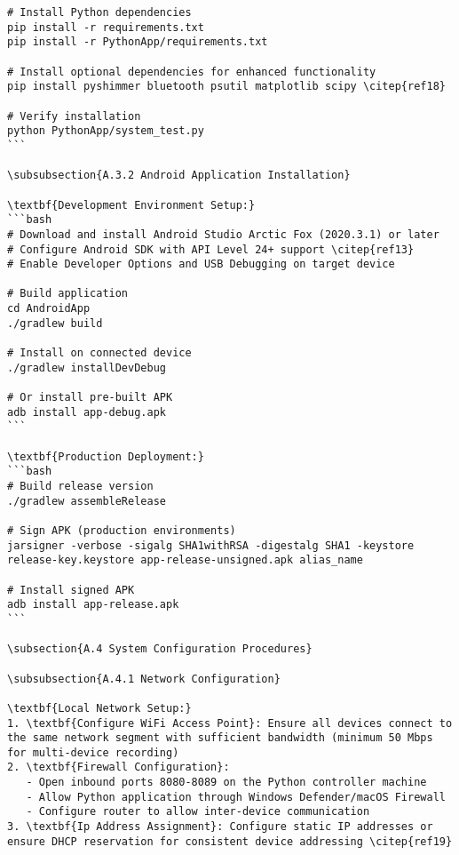 \begin{verbatim}
# Install Python dependencies
pip install -r requirements.txt
pip install -r PythonApp/requirements.txt

# Install optional dependencies for enhanced functionality
pip install pyshimmer bluetooth psutil matplotlib scipy \citep{ref18}

# Verify installation
python PythonApp/system_test.py
```

\subsubsection{A.3.2 Android Application Installation}

\textbf{Development Environment Setup:}
```bash
# Download and install Android Studio Arctic Fox (2020.3.1) or later
# Configure Android SDK with API Level 24+ support \citep{ref13}
# Enable Developer Options and USB Debugging on target device

# Build application
cd AndroidApp
./gradlew build

# Install on connected device
./gradlew installDevDebug

# Or install pre-built APK
adb install app-debug.apk
```

\textbf{Production Deployment:}
```bash
# Build release version
./gradlew assembleRelease

# Sign APK (production environments)
jarsigner -verbose -sigalg SHA1withRSA -digestalg SHA1 -keystore release-key.keystore app-release-unsigned.apk alias_name

# Install signed APK
adb install app-release.apk
```

\subsection{A.4 System Configuration Procedures}

\subsubsection{A.4.1 Network Configuration}

\textbf{Local Network Setup:}
1. \textbf{Configure WiFi Access Point}: Ensure all devices connect to the same network segment with sufficient bandwidth (minimum 50 Mbps for multi-device recording)
2. \textbf{Firewall Configuration}:
   - Open inbound ports 8080-8089 on the Python controller machine
   - Allow Python application through Windows Defender/macOS Firewall
   - Configure router to allow inter-device communication
3. \textbf{Ip Address Assignment}: Configure static IP addresses or ensure DHCP reservation for consistent device addressing \citep{ref19}


\end{verbatim}
